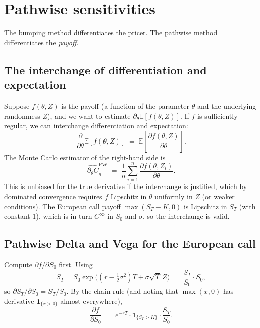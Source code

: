 \documentclass[11pt,a4paper]{article}
\theoremstyle{plain}
\theoremstyle{definition}
\theoremstyle{remark}
\newcommand{\E}{\mathbb{E}}
\newcommand{\indic}{\mathbf{1}}
\begin{document}
\section{Pathwise sensitivities}
\label{sec:pathwise}

The bumping method differentiates the pricer. The pathwise method
differentiates the \emph{payoff}.

\subsection{The interchange of differentiation and expectation}

Suppose $f(\theta, Z)$ is the payoff (a function of the parameter
$\theta$ and the underlying randomness $Z$), and we want to
estimate $\partial_\theta \E[f(\theta, Z)]$. If $f$ is sufficiently
regular, we can interchange differentiation and expectation:
\begin{equation}
\frac{\partial}{\partial\theta} \E[f(\theta, Z)]
\;=\; \E\!\left[\frac{\partial f(\theta, Z)}{\partial \theta}\right].
\end{equation}
The Monte Carlo estimator of the right-hand side is
\begin{equation}
\widehat{\partial_\theta C}_n^{\mathrm{PW}}
\;=\; \frac{1}{n} \sum_{i=1}^n
\frac{\partial f(\theta, Z_i)}{\partial \theta}.
\end{equation}
This is unbiased for the true derivative if the interchange is
justified, which by dominated convergence requires $f$ Lipschitz in
$\theta$ uniformly in $Z$ (or weaker conditions). The European call
payoff $\max(S_T - K, 0)$ is Lipschitz in $S_T$ (with constant 1),
which is in turn $C^\infty$ in $S_0$ and $\sigma$, so the
interchange is valid.

\subsection{Pathwise Delta and Vega for the European call}

Compute $\partial f/\partial S_0$ first. Using
\begin{equation}
S_T = S_0 \exp\bigl((r - \tfrac{1}{2}\sigma^2)T + \sigma\sqrt T \,Z\bigr)
\;=\; \frac{S_T}{S_0} \cdot S_0,
\end{equation}
so $\partial S_T / \partial S_0 = S_T / S_0$. By the chain rule
(and noting that $\max(x, 0)$ has derivative $\indic_{\{x > 0\}}$
almost everywhere),
\begin{equation}
\frac{\partial f}{\partial S_0}
\;=\; e^{-rT} \cdot \indic_{\{S_T > K\}} \cdot \frac{S_T}{S_0}.
\end{equation}
\end{document}
